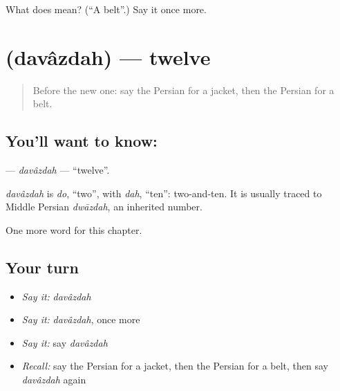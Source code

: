 \begin{tcolorbox}[breakable,colback=teal!4,colframe=teal!35!black,title={Before you move on}]
What does  mean? (\textquotedblleft{}A belt\textquotedblright{}.) Say it once more.
\end{tcolorbox}
\section[\texorpdfstring{\fa{دوازده} (davâzdah)}{دوازده (davâzdah)}]{ (davâzdah) — twelve}

\label{lesson:FA-C75-davazdah}



\begin{quote}
Before the new one: say the Persian for a jacket, then the Persian for a belt.
\end{quote}

\subsection*{You'll want to know: }
\textbf{} — \emph{davâzdah} — \textquotedblleft{}twelve\textquotedblright{}.

\begin{cousinweb}
\emph{davâzdah} is \emph{do}, \textquotedblleft{}two\textquotedblright{}, with \emph{dah}, \textquotedblleft{}ten\textquotedblright{}: two-and-ten. It is usually traced to Middle Persian \emph{dwāzdah}, an inherited number.
\end{cousinweb}

\begin{grammarlens}[title={What you've built}]
One more word for this chapter.
\end{grammarlens}

\subsection*{Your turn}
\begin{itemize}
\raggedright
  \item \emph{Say it:} \emph{davâzdah}
  \item \emph{Say it:} \emph{davâzdah}, once more
  \item \emph{Say it:} say \emph{davâzdah}
  \item \emph{Recall:} say the Persian for a jacket, then the Persian for a belt, then say \emph{davâzdah} again
\end{itemize}

